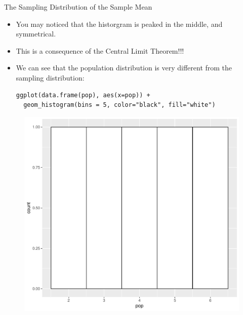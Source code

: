\documentclass[handout]{beamer}
\begin{document}
\begin{frame}[fragile]{The Sampling Distribution of the Sample Mean}
\scriptsize{
\begin{itemize}
\item You may noticed that the historgram is peaked in the middle, and symmetrical.
\item This is a consequence of the Central Limit Theorem!!!
\item We can see that the population distribution is very different from the sampling distribution:
\begin{verbatim}
ggplot(data.frame(pop), aes(x=pop)) +
  geom_histogram(bins = 5, color="black", fill="white")
\end{verbatim}


\end{itemize}

\begin{figure}[h!]
	\centering
	\includegraphics[scale=0.3]{pics/pop_dist.pdf}
\end{figure}




} 
\end{frame}
\end{document}
